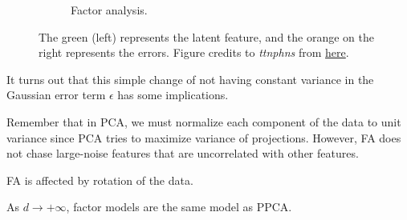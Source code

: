 \begin{figure}[H]
\begin{subfigure}[b]{0.6\textwidth}
      \caption{Factor analysis.}
    \end{subfigure}
    \caption{The green (left) represents the latent feature, and the orange on the right represents the errors. Figure credits to \textit{ttnphns} from \href{https://stats.stackexchange.com/questions/1576/what-are-the-differences-between-factor-analysis-and-principal-component-analysi}{here}.}
  \end{figure}

  It turns out that this simple change of not having constant variance in the Gaussian error term $\epsilon$ has some implications. 

  \begin{example}
    Remember that in PCA, we must normalize each component of the data to unit variance since PCA tries to maximize variance of projections. However, FA does not chase large-noise features that are uncorrelated with other features. 
  \end{example}

  \begin{example}
    FA is affected by rotation of the data. \cite{2018schmidt}
  \end{example}

  \begin{theorem}
    As $d \to +\infty$, factor models are the same model as PPCA. 
  \end{theorem}

